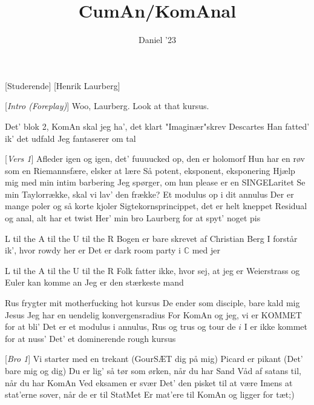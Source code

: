 \documentclass{article}
\title{CumAn/KomAnal}
\author{Daniel '23}
\begin{document}
\maketitle

\begin{roles}
    [Studerende]
    [Henrik Laurberg]
\end{roles}

\begin{song}

    [\textit{Intro (Foreplay)}] Woo, Laurberg. Look at that kursus.

     Det' blok 2, KomAn skal jeg ha', det klart
    "Imaginær"\hspace{0.1cm}skrev Descartes
    Han fatted' ik' det udfald
    Jeg fantaserer om tal
    
    [\textit{Vers 1}] Afleder igen og igen, det' fuuuucked op, den er holomorf
    Hun har en røv som en Riemannsfære, elsker at lære
    Så potent, eksponent, eksponering
    Hjælp mig med min intim barbering
    Jeg spørger, om hun please er en SINGELaritet
    Se min Taylorrække, skal vi lav' den frække?
    Et modulus op i dit annulus
    Der er mange poler og så korte kjoler
    Sigtekornsprincippet, det er helt kneppet
    Residual og anal, alt har et twist
    Her' min bro Laurberg for at spyt' noget pis

     L til the A til the U til the R
    Bogen er bare skrevet af Christian Berg
    I forstår ik', hvor rowdy her er
    Det er dark room party i $\mathbb{C}$ med jer\vspace{0.2cm}
    
    L til the A til the U til the R
    Folk fatter ikke, hvor sej, at jeg er
    Weierstrass og Euler kan komme an
    Jeg er den stærkeste mand\vspace{0.2cm}

    Rus frygter mit motherfucking hot kursus
    De ender som disciple, bare kald mig Jesus
    Jeg har en uendelig konvergensradius
    For KomAn og jeg, vi er KOMMET for at bli'
    Det er et modulus i annulus, Rus og trus og tour de $i$
    I er ikke kommet for at nuss'
    Det' et dominerende rough kursus

    [\textit{Bro 1}] Vi starter med en trekant
     (GourSÆT dig på mig)
     Picard er pikant
     (Det' bare mig og dig)
     Du er lig' så tør som ørken, når du har Sand
    Våd af satans til, når du har KomAn
     Ved eksamen er svær
    Det' den pisket til at være
     Imens at stat'erne sover, når de er til StatMet
    Er mat'ere til KomAn og ligger for tæt;) 


\end{song}
\end{document}
